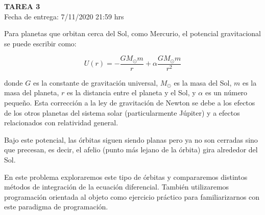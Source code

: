 \documentclass[letter, 11pt]{article}
\newcommand{\tareanro}{3}
\newcommand{\fechaentrega}{7/11/2020 21:59 hrs}
\begin{document}
\thispagestyle{firstpage}

\begin{center}
  {\uppercase{\LARGE \bf Tarea \tareanro}}\\
  Fecha de entrega: \fechaentrega
\end{center}



Para planetas que orbitan cerca del Sol, como Mercurio, el potencial
gravitacional se puede escribir como:

$$U(r) = - \dfrac{GM_\odot m}{r} + \alpha\dfrac{GM_\odot m}{r^2}$$

\noindent donde $G$ es la constante de gravitación universal, $M_\odot$ es la
masa del Sol, $m$ es la masa del planeta, $r$ es la distancia entre el planeta
y el Sol, y $\alpha$ es un número pequeño. Esta corrección a la ley de
gravitación de Newton se debe a los efectos de los otros planetas del sistema
solar (particularmente Júpiter) y a efectos relacionados con relatividad
general.

Bajo este potencial, las órbitas siguen siendo planas pero ya no son cerradas
sino que precesan, es decir, el afelio (punto más lejano de la órbita) gira
alrededor del Sol.

En este problema exploraremos este tipo de órbitas y compararemos distintos
métodos de integración de la ecuación diferencial. También utilizaremos
programación orientada al objeto como ejercicio práctico para familiarizarnos
con este paradigma de programación.
\end{document}
